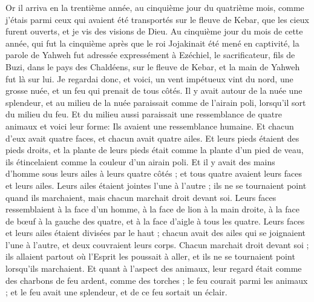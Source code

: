 \begin{multicols}{2}
\VerseOne{}Or il arriva en la trentième année, au cinquième jour du quatrième mois, comme j'étais parmi ceux qui avaient été transportés sur le fleuve de Kebar, que les cieux furent ouverts, et je vis des visions de Dieu.
Au cinquième jour du mois de cette année, qui fut la cinquième après que le roi Jojakinait été mené en captivité,
la parole de Yahweh fut adressée expressément à Ezéchiel, le sacrificateur, fils de Buzi, dans le pays des Chaldéens, sur le fleuve de Kebar, et la main de Yahweh fut là sur lui.
Je regardai donc, et voici, un vent impétueux vint du nord, une grosse nuée, et un feu qui prenait de tous côtés. Il y avait autour de la nuée une splendeur, et au milieu de la nuée paraissait comme de l'airain poli, lorsqu'il sort du milieu du feu.
Et du milieu aussi paraissait une ressemblance de quatre animaux et voici leur forme: Ils avaient une ressemblance humaine.
Et chacun d'eux avait quatre faces, et chacun avait quatre ailes.
Et leurs pieds étaient des pieds droits, et la plante de leurs pieds était comme la plante d'un pied de veau, ils étincelaient comme la couleur d'un airain poli.
Et il y avait des mains d'homme sous leurs ailes à leurs quatre côtés ; et tous quatre avaient leurs faces et leurs ailes.
Leurs ailes étaient jointes l'une à l'autre ; ils ne se tournaient point quand ils marchaient, mais chacun marchait droit devant soi.
Leurs faces ressemblaient à la face d'un homme, à la face de lion à la main droite, à la face de bœuf à la gauche des quatre, et à la face d'aigle à tous les quatre.
Leurs faces et leurs ailes étaient divisées par le haut ; chacun avait des ailes qui se joignaient l'une à l'autre, et deux couvraient leurs corps.
Chacun marchait droit devant soi ; ils allaient partout où l'Esprit les poussait à aller, et ils ne se tournaient point lorsqu'ils marchaient.
Et quant à l'aspect des animaux, leur regard était comme des charbons de feu ardent, comme des torches ; le feu courait parmi les animaux ; et le feu avait une splendeur, et de ce feu sortait un éclair.

\end{multicols}
